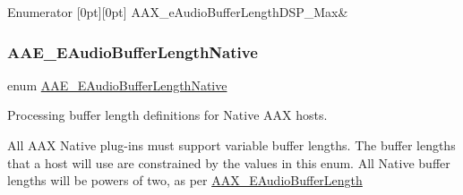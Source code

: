 \begin{DoxyEnumFields}{Enumerator}
[0pt][0pt]{}\mbox{\label{a00491_ab33e0f1ecf04ca4161fa8d8de5845d67a57a153374909e0ceb9ff4ebfb5d5476f}} 
A\+A\+X\+\_\+e\+Audio\+Buffer\+Length\+D\+S\+P\+\_\+\+Max&\\
\hline

\end{DoxyEnumFields}
\mbox{\label{a00491_aa1769ee466fd07659d8c7ef5ac61cd49}} 
\subsubsection{\texorpdfstring{AAE\_EAudioBufferLengthNative}{AAE\_EAudioBufferLengthNative}}
{\footnotesize\ttfamily enum \mbox{\hyperlink{a00491_aa1769ee466fd07659d8c7ef5ac61cd49}{A\+A\+E\+\_\+\+E\+Audio\+Buffer\+Length\+Native}}}



Processing buffer length definitions for Native A\+AX hosts. 

All A\+AX Native plug-\/ins must support variable buffer lengths. The buffer lengths that a host will use are constrained by the values in this enum. All Native buffer lengths will be powers of two, as per \mbox{\hyperlink{a00491_ada5e011bdfdc6a996de752662b3dfbe7}{A\+A\+X\+\_\+\+E\+Audio\+Buffer\+Length}}

